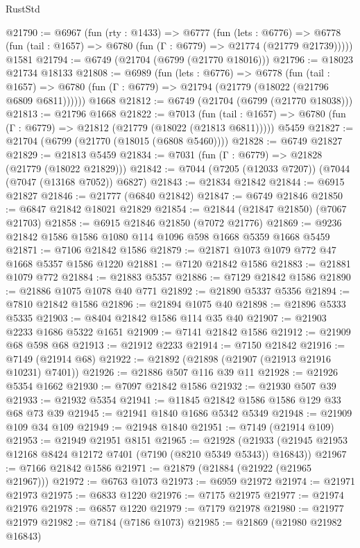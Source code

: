 \begin{lexlean}{RustStd}
\begin{coremodule}
@21790 := @6967
    (fun (rty : @1433) =>
    @6777
      (fun (lets : @6776) =>
      @6778 (fun (tail : @1657) => @6780 (fun (Γ : @6779) => @21774 (@21779 @21739)))))
    @1581
@21794 := @6749 (@21704 (@6799 (@21770 @18016)))
@21796 := @18023 @21734 @18133
@21808 := @6989
    (fun (lets : @6776) =>
    @6778
      (fun (tail : @1657) =>
      @6780 (fun (Γ : @6779) => @21794 (@21779 (@18022 (@21796 @6809 @6811))))))
    @1668
@21812 := @6749 (@21704 (@6799 (@21770 @18038)))
@21813 := @21796 @1668
@21822 := @7013
    (fun (tail : @1657) => @6780 (fun (Γ : @6779) => @21812 (@21779 (@18022 (@21813 @6811)))))
    @5459
@21827 := @21704 (@6799 (@21770 (@18015 (@6808 @5460))))
@21828 := @6749 @21827
@21829 := @21813 @5459
@21834 := @7031 (fun (Γ : @6779) => @21828 (@21779 (@18022 @21829)))
@21842 := @7044 (@7205 (@12033 @7207)) (@7044 (@7047 (@13168 @7052)) @6827)
@21843 := @21834 @21842
@21844 := @6915 @21827
@21846 := @21777 (@6840 @21842)
@21847 := @6749 @21846
@21850 := @6847 @21842 @18021 @21829
@21854 := @21844 (@21847 @21850) (@7067 @21703)
@21858 := @6915 @21846 @21850 (@7072 @21776)
@21869 := @9236 @21842 @1586 @1586 @1080 @114 @1096 @598 @1668 @5359 @1668 @5459
@21871 := @7106 @21842 @1586
@21879 := @21871 @1073 @1079 @772 @47 @1668 @5357 @1586 @1220
@21881 := @7120 @21842 @1586
@21883 := @21881 @1079 @772
@21884 := @21883 @5357
@21886 := @7129 @21842 @1586
@21890 := @21886 @1075 @1078 @40 @771
@21892 := @21890 @5337 @5356
@21894 := @7810 @21842 @1586
@21896 := @21894 @1075 @40
@21898 := @21896 @5333 @5335
@21903 := @8404 @21842 @1586 @114 @35 @40
@21907 := @21903 @2233 @1686 @5322 @1651
@21909 := @7141 @21842 @1586
@21912 := @21909 @68 @598 @68
@21913 := @21912 @2233
@21914 := @7150 @21842
@21916 := @7149 (@21914 @68)
@21922 := @21892 (@21898 (@21907 (@21913 @21916 @10231) @7401))
@21926 := @21886 @507 @116 @39 @11
@21928 := @21926 @5354 @1662
@21930 := @7097 @21842 @1586
@21932 := @21930 @507 @39
@21933 := @21932 @5354
@21941 := @11845 @21842 @1586 @1586 @129 @33 @68 @73 @39
@21945 := @21941 @1840 @1686 @5342 @5349
@21948 := @21909 @109 @34 @109
@21949 := @21948 @1840
@21951 := @7149 (@21914 @109)
@21953 := @21949 @21951 @8151
@21965 := @21928
    (@21933 (@21945 @21953 @12168 @8424 @12172 @7401 (@7190 (@8210 @5349 @5343)) @16843))
@21967 := @7166 @21842 @1586
@21971 := @21879 (@21884 (@21922 (@21965 @21967)))
@21972 := @6763 @1073
@21973 := @6959 @21972
@21974 := @21971 @21973
@21975 := @6833 @1220
@21976 := @7175 @21975
@21977 := @21974 @21976
@21978 := @6857 @1220
@21979 := @7179 @21978
@21980 := @21977 @21979
@21982 := @7184 (@7186 @1073)
@21985 := @21869 (@21980 @21982 @16843)

\end{coremodule}
\end{lexlean}
